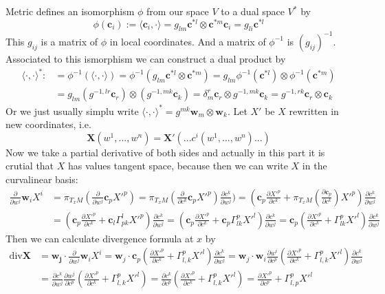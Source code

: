 Metric defines an isomorphism $\phi$ from our space $V$ to a dual space $V^*$ by
\[\phi(\mathbf{c}_i):=\langle\mathbf{c}_i,\cdot\rangle=g_{lm}\mathbf{c}^{*l}\otimes\mathbf{c}^{*m}\mathbf{c}_i=g_{li}\mathbf{c}^{*l}\]
This $g_{ij}$ is a matrix of $\phi$ in local coordinates. And a matrix of $\phi^{-1}$ is
$(g_{ij})^{-1}$. Associated to this ismorphism we can construct a dual product by
\begin{align*}
    \langle\cdot,\cdot\rangle^*:&=\phi^{-1}(\langle\cdot,\cdot\rangle)=\phi^{-1}(g_{lm}\mathbf{c}^{*l}\otimes\mathbf{c}^{*m})
=g_{lm}\phi^{-1}(\mathbf{c}^{*l})\otimes\phi^{-1}(\mathbf{c}^{*m})\\
    &=g_{lm}(g^{-1,lr}\mathbf{c}_r)\otimes(g^{-1,mk}\mathbf{c}_k)
=\delta_m^r\mathbf{c}_r\otimes g^{-1,mk}\mathbf{c}_k=g^{-1,rk}\mathbf{c}_r\otimes \mathbf{c}_k
\end{align*}
Or we just usually simplu write $\langle\cdot,\cdot\rangle^*=g^{mk}\mathbf{w}_m\otimes \mathbf{w}_k$.
Let $X'$ be $X$ rewritten in new coordinates, i.e.
\[\mathbf{X}(w^1,...,w^n)=\mathbf{X}'(...c^i(w^1,...,w^n)...)\]
Now we take a partial derivative of both sides and actually in this part it is
crutial that $X$ has values tangent space, because then we can write $X$ in the
curvalinear basis:
\begin{align*}
\frac{\partial}{\partial w^j}\mathbf{w}_iX^i&
=\pi_{T_x M}(\frac{\partial}{\partial w^j}\mathbf{c}_pX'^p)
=\pi_{T_x M}(\frac{\partial}{\partial c^k}\mathbf{c}_pX'^p)\frac{\partial c^k}{\partial w^j})
    =(\mathbf{c}_p\frac{\partial X'^p}{\partial c^k}+\pi_{T_x M}(\frac{\partial\mathbf{c}_p}{\partial c^k})X'^p)\frac{\partial c^k}{\partial w^j}\\
&=(\mathbf{c}_p\frac{\partial X'^p}{\partial c^k}+\mathbf{c}_l\Gamma^l_{pk}X'^p)\frac{\partial c^k}{\partial w^j}
=(\mathbf{c}_p\frac{\partial X'^p}{\partial c^k}+\mathbf{c}_p\Gamma^p_{lk}X'^l)\frac{\partial c^k}{\partial w^j}
=\mathbf{c}_p(\frac{\partial X'^p}{\partial c^k}+\Gamma^p_{lk}X'^l)\frac{\partial c^k}{\partial w^j}
\end{align*}
Then we can calculate divergence formula at $x$ by
\begin{align*}
\text{div}\mathbf{X}&=\mathbf{w_j}\cdot\frac{\partial}{\partial w^j}\mathbf{w}_iX^i
=\mathbf{w}_j\cdot\mathbf{c}_p(\frac{\partial X'^p}{\partial c^k}+\Gamma^p_{l,k}X'^l)\frac{\partial c^k}{\partial w^j}
=\mathbf{w}_j\cdot\mathbf{w}_i\frac{\partial w^i}{\partial c^p}(\frac{\partial X'^p}{\partial c^k}+\Gamma^p_{l,k}X'^l)\frac{\partial c^k}{\partial w^j}\\
&=\frac{\partial c^k}{\partial w^j}\frac{\partial w^j}{\partial c^p}(\frac{\partial X'^p}{\partial c^k}+\Gamma^p_{l,k}X'^l)
=\frac{\partial c^k}{\partial c^p}(\frac{\partial X'^p}{\partial c^k}+\Gamma^p_{l,k}X'^l)
=\frac{\partial X'^p}{\partial c^p}+\Gamma^p_{l,p}X'^l
\end{align*}

